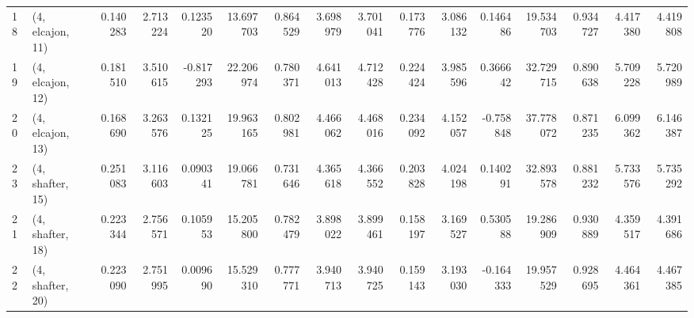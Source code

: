 \begin{tabular}{llrrrrrrrrrrrrrr}
18 &  (4, elcajon, 11) &   0.140283 &  2.713224 &  0.123520 &  13.697703 &  0.864529 &   3.698979 &  3.701041 &  0.173776 &  3.086132 &  0.146486 &   19.534703 &  0.934727 &   4.417380 &   4.419808 \\
19 &  (4, elcajon, 12) &   0.181510 &  3.510615 & -0.817293 &  22.206974 &  0.780371 &   4.641013 &  4.712428 &  0.224424 &  3.985596 &  0.366642 &   32.729715 &  0.890638 &   5.709228 &   5.720989 \\
20 &  (4, elcajon, 13) &   0.168690 &  3.263576 &  0.132125 &  19.963165 &  0.802981 &   4.466062 &  4.468016 &  0.234092 &  4.152057 & -0.758848 &   37.778072 &  0.871235 &   6.099362 &   6.146387 \\
23 &  (4, shafter, 15) &   0.251083 &  3.116603 &  0.090341 &  19.066781 &  0.731646 &   4.365618 &  4.366552 &  0.203828 &  4.024198 &  0.140291 &   32.893578 &  0.881232 &   5.733576 &   5.735292 \\
21 &  (4, shafter, 18) &   0.223344 &  2.756571 &  0.105953 &  15.205800 &  0.782479 &   3.898022 &  3.899461 &  0.158197 &  3.169527 &  0.530588 &   19.286909 &  0.930889 &   4.359517 &   4.391686 \\
22 &  (4, shafter, 20) &   0.223090 &  2.751995 &  0.009690 &  15.529310 &  0.777771 &   3.940713 &  3.940725 &  0.159143 &  3.193030 & -0.164333 &   19.957529 &  0.928695 &   4.464361 &   4.467385 \\
\bottomrule
\end{tabular}
